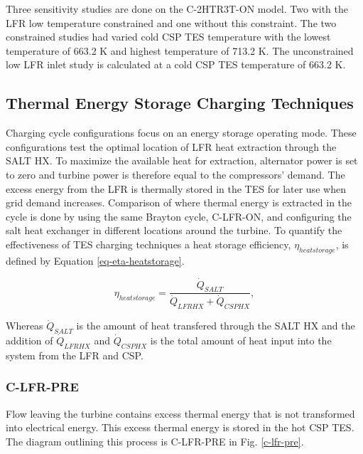 \begin{paracol}{2}
\linenumbers
\switchcolumn

Three sensitivity studies are done on the C-2HTR3T-ON model. Two with the LFR low temperature constrained and one without this constraint. The two constrained studies had varied cold CSP TES temperature with the lowest temperature of 663.2 K and highest temperature of 713.2 K. The unconstrained low LFR inlet study is calculated at a cold CSP TES temperature of 663.2 K.  



\subsection{Thermal Energy Storage Charging Techniques} %

Charging cycle configurations focus on an energy storage operating mode. These configurations test the optimal location of LFR heat extraction through the SALT HX. To maximize the available heat for extraction, alternator power is set to zero and turbine power is therefore equal to the compressors' demand. The excess energy from the LFR is thermally stored in the TES for later use when grid demand increases. Comparison of where thermal energy is extracted in the cycle is done by using the same Brayton cycle, C-LFR-ON, and configuring the salt heat exchanger in different locations around the turbine. To quantify the effectiveness of TES charging techniques a heat storage efficiency, $\eta_{heatstorage}$, is defined by Equation \ref{eq-eta-heatstorage}.

\begin{equation}
    \label{eq-eta-heatstorage}
    \eta_{heatstorage} = \frac{\dot{Q}_{SALT}}{\dot{Q}_{LFRHX}+\dot{Q}_{CSPHX}},
\end{equation}

Whereas $\dot{Q}_{SALT}$ is the amount of heat transfered through the SALT HX and the addition of $\dot{Q}_{LFRHX}$ and $\dot{Q}_{CSPHX}$ is the total amount of heat input into the system from the LFR and CSP.

\subsubsection{C-LFR-PRE} %

Flow leaving the turbine contains excess thermal energy that is not transformed into electrical energy. This excess thermal energy is stored in the hot CSP TES. The diagram outlining this process is C-LFR-PRE in Fig. \ref{c-lfr-pre}.  

\end{paracol}
